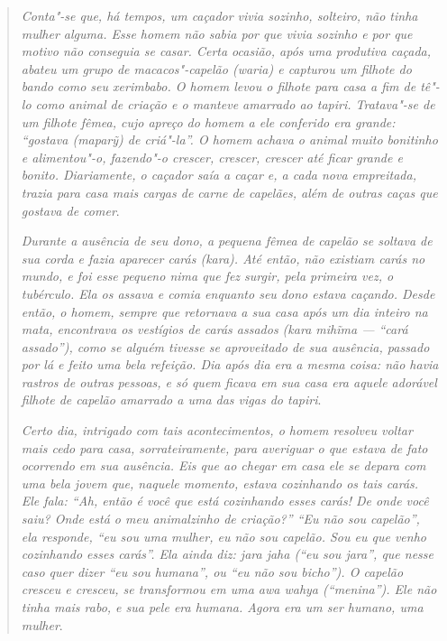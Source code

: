 \begin{quote}
\emph{Conta"-se que, há tempos, um caçador vivia sozinho, solteiro, não tinha
mulher alguma. Esse homem não sabia por que vivia sozinho e por que
motivo não conseguia se casar. Certa ocasião, após uma produtiva caçada,
abateu um grupo de macacos"-capelão (\emph{waria}) e capturou um filhote
do bando como seu xerimbabo. O homem levou o filhote para casa a fim de
tê"-lo como animal de criação e o manteve amarrado ao tapiri. Tratava"-se
de um filhote fêmea, cujo apreço do homem a ele conferido era grande:
``gostava (\emph{maparỹ}) de criá"-la''. O homem achava o animal muito
bonitinho e alimentou"-o, fazendo"-o crescer, crescer, crescer até ficar
grande e bonito. Diariamente, o caçador saía a caçar e, a cada nova
empreitada, trazia para casa mais cargas de carne de capelães, além de
outras caças que gostava de comer}.

\emph{Durante a ausência de seu dono, a pequena fêmea de capelão se soltava de
sua corda e fazia aparecer carás (\emph{kara}). Até então, não existiam
carás no mundo, e foi esse pequeno \emph{nima} que fez surgir, pela
primeira vez, o tubérculo. Ela os assava e comia enquanto seu dono
estava caçando. Desde então, o homem, sempre que retornava a sua casa
após um dia inteiro na mata, encontrava os vestígios de carás assados
(\emph{kara mihĩma} --- ``cará assado''), como se alguém tivesse se
aproveitado de sua ausência, passado por lá e feito uma bela refeição.
Dia após dia era a mesma coisa: não havia rastros de outras pessoas, e
só quem ficava em sua casa era aquele adorável filhote de capelão
amarrado a uma das vigas do tapiri}.

\emph{Certo dia, intrigado com tais acontecimentos, o homem resolveu voltar
mais cedo para casa, sorrateiramente, para averiguar o que estava de
fato ocorrendo em sua ausência. Eis que ao chegar em casa ele se depara
com uma bela jovem que, naquele momento, estava cozinhando os tais
carás. Ele fala: ``Ah, então é você que está cozinhando esses carás! De
onde você saiu? Onde está o meu animalzinho de criação?'' ``Eu não sou
capelão'', ela responde, ``eu sou uma mulher, eu não sou capelão. Sou eu
que venho cozinhando esses carás''. Ela ainda diz: \emph{jara jaha} (``eu
sou \emph{jara}'', que nesse caso quer dizer ``eu sou humana'', ou ``eu não
sou bicho''). O capelão cresceu e cresceu, se transformou em uma
\emph{awa wahya} (``menina''). Ele não tinha mais rabo, e sua pele era
humana. Agora era um ser humano, uma mulher}.
\end{quote}

